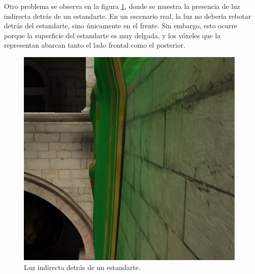 Otro problema se observa en la figura \ref{fig:indirect-behind-banner}, donde se muestra la presencia de luz indirecta detrás de un estandarte.
En un escenario real, la luz no debería rebotar detrás del estandarte, sino únicamente en el frente.
Sin embargo, esto ocurre porque la superficie del estandarte es muy delgada, y los vóxeles que la representan abarcan tanto el lado frontal como el posterior.

\begin{figure}
	\centering
	\includegraphics[width=\textwidth]{indirect-behind-banner.png}
	\caption{Luz indirecta detrás de un estandarte.}
	\label{fig:indirect-behind-banner}
\end{figure}
